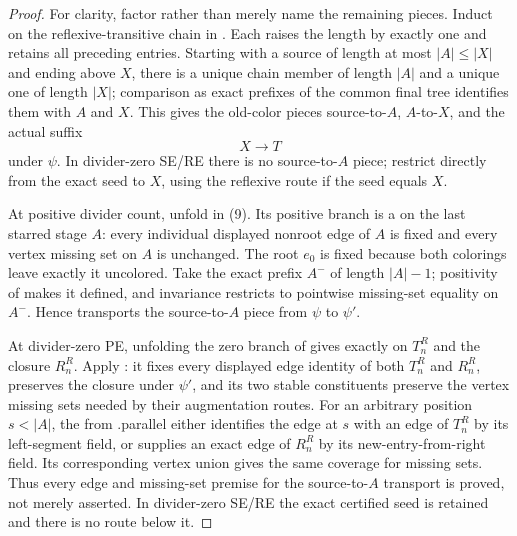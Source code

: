 \begin{proof}
For clarity, factor rather than merely name the remaining pieces.  Induct
on the reflexive-transitive chain in
.  Each
 raises the length by exactly one and
retains all preceding entries.  Starting with a source of length at most
\(|A|\leq|X|\) and ending above \(X\), there is a unique chain member of
length \(|A|\) and a unique one of length \(|X|\); comparison as exact
prefixes of the common final tree identifies them with \(A\) and \(X\).
This gives the old-color pieces source-to-\(A\), \(A\)-to-\(X\), and the
actual suffix
\[
                         X\longrightarrow T                    \tag{10}
\]
under \(\psi\).  In divider-zero SE/RE there is no source-to-\(A\) piece;
restrict directly from the exact seed to \(X\), using the reflexive route
if the seed equals \(X\).

At positive divider count, unfold
 in (9).  Its positive branch is a
 on the last starred stage \(A\): every
individual displayed nonroot edge of \(A\) is fixed and every vertex
missing set on \(A\) is unchanged.  The root \(e_0\) is fixed because both
colorings leave exactly it uncolored.  Take the exact prefix \(A^-\) of
length \(|A|-1\); positivity of  makes it defined,
and invariance restricts to pointwise missing-set equality on \(A^-\).
Hence
 transports the
source-to-\(A\) piece from \(\psi\) to \(\psi'\).

At divider-zero PE, unfolding the zero branch of
 gives exactly
 on \(T_n^R\) and the closure \(R_n^R\).
Apply : it fixes every displayed
edge identity of both \(T_n^R\) and \(R_n^R\), preserves the closure under
\(\psi'\), and its two stable constituents preserve the vertex missing
sets needed by their augmentation routes.  For an arbitrary position
\(s<|A|\), the  from
.parallel either identifies the edge at \(s\) with
an edge of \(T_n^R\) by its left-segment field, or supplies an exact edge
of \(R_n^R\) by its new-entry-from-right field.  Its corresponding vertex
union gives the same coverage for missing sets.  Thus every edge and
missing-set premise for the source-to-\(A\) transport is proved, not merely
asserted.  In divider-zero SE/RE the exact certified seed is retained and
there is no route below it.


\end{proof}
